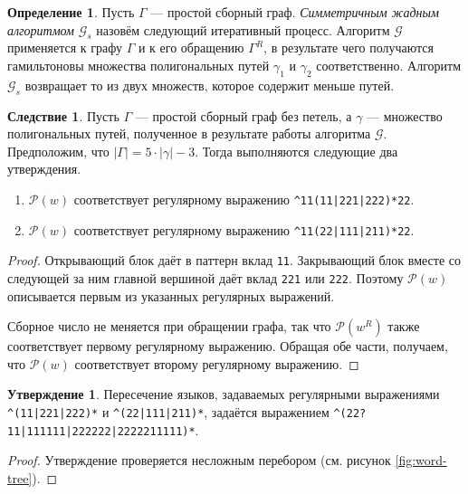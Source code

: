 \documentclass{article}
\theoremstyle{definition}
\newtheorem{conjecture}[theorem]{Утверждение}
\newtheorem{definition}[theorem]{Определение}
\newtheorem{corollary}[theorem]{Следствие}
\newcommand{\G}{\mathcal{G}}
\newcommand{\pattern}{\mathcal{P}}
\begin{document}
\begin{definition}\label{def:sym-G}
    Пусть \(\Gamma\) — простой сборный граф. \textit{Симметричным жадным 
    алгоритмом} \(\G_s\) назовём следующий итеративный процесс. 
    Алгоритм \(\G\) применяется к графу \(\Gamma\) и к его 
    обращению \(\Gamma^R\), в результате чего получаются гамильтоновы 
    множества полигональных путей \(\gamma_1\) и \(\gamma_2\) 
    соответственно. Алгоритм \(\mathcal{G}_s\) возвращает то из двух 
    множеств, которое содержит меньше путей.
\end{definition}


\begin{corollary}
    Пусть \(\Gamma\) — простой сборный граф без петель, а \(\gamma\) — 
    множество полигональных путей, полученное в результате работы 
    алгоритма \(\G\). Предположим, что \(|\Gamma| = 5\cdot |\gamma| - 3\). 
    Тогда выполняются следующие два утверждения.
    \begin{enumerate}
        \item \(\pattern(w)\) соответствует регулярному выражению 
        \texttt{\^{}11(11|221|222)*22}.
        \item \(\pattern(w)\) соответствует регулярному выражению 
        \texttt{\^{}11(22|111|211)*22}.
    \end{enumerate}
\end{corollary}

\begin{proof}
    Открывающий блок даёт в паттерн вклад \texttt{11}. Закрывающий блок 
    вместе со следующей за ним главной вершиной даёт вклад \texttt{221} 
    или \texttt{222}. Поэтому \(\pattern(w)\) описывается первым из 
    указанных регулярных выражений.

    Сборное число не меняется при обращении графа, так что 
    \(\pattern(w^R)\) также соответствует первому регулярному выражению. 
    Обращая обе части, получаем, что \(\pattern(w)\) соответствует 
    второму регулярному выражению.
\end{proof}

\begin{conjecture}
    Пересечение языков, задаваемых регулярными выражениями 
    \texttt{\^{}(11|221|222)*} и \texttt{\^{}(22|111|211)*}, задаётся 
    выражением  \texttt{\^{}(22?11|111111|222222|2222211111)*}.
\end{conjecture}

\begin{proof}
    Утверждение проверяется несложным перебором (см. рисунок \ref{fig:word-tree}).
\end{proof}
\end{document}
